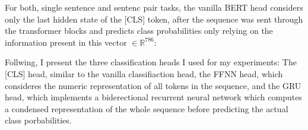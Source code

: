 




For both, single sentence and sentenc pair tasks, the vanilla BERT head considers
only the last hidden state of the [CLS] token, after the sequence was sent through
the transformer blocks and predicts class probabilities only relying on the
information present in this vector $\in \mathbb{R}^{786}$:


Follwing, I present the three classification heads I used for my experiments: The [CLS]
head, similar to the vanilla classifiaction head, the FFNN head, which consideres the
numeric representation of all tokens in the sequence, and the GRU head, which implements
a biderectional recurrent neural network which computes a condensed representation of
the whole sequence before predicting the actual class porbabilities.



